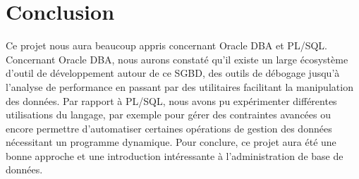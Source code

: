 \documentclass[12pt,a4paper]{article}
\begin{document}
\section{Conclusion}
\label{sec.conc}

Ce projet nous aura beaucoup appris concernant Oracle DBA et PL/SQL. Concernant
Oracle DBA, nous aurons constaté qu’il existe un large écosystème d’outil de
développement autour de ce SGBD, des outils de débogage jusqu’à l’analyse de
performance en passant par des utilitaires facilitant la manipulation des
données. Par rapport à PL/SQL, nous avons pu expérimenter différentes
utilisations du langage, par exemple pour gérer des contraintes avancées ou
encore permettre d’automatiser certaines opérations de gestion des données
nécessitant un programme dynamique. Pour conclure, ce projet aura été une bonne
approche et une introduction intéressante à l’administration de base de données.
\end{document}

